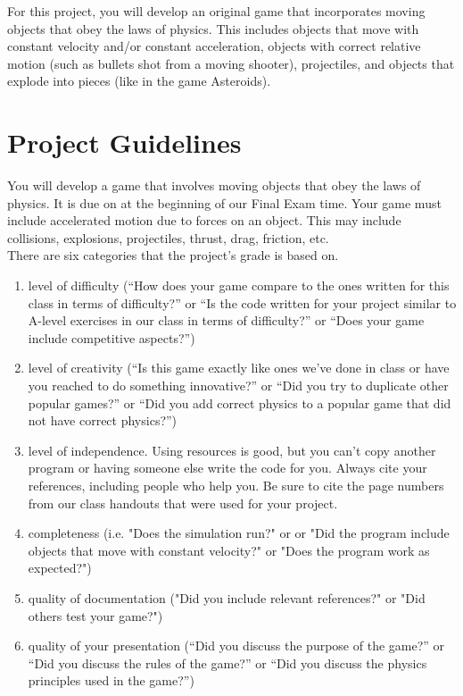 

\longgoal

For this project, you will develop an original game that incorporates moving objects that obey the laws of physics. This includes objects that move with constant velocity and/or constant acceleration, objects with correct relative motion (such as bullets shot from a moving shooter), projectiles, and objects that explode into pieces (like in the game Asteroids).

\section*{Project Guidelines}

You will develop a game that involves moving objects that obey the laws of physics. It is due on at the beginning of our Final Exam time. Your game must include  accelerated motion due to forces on an object. This may include collisions, explosions, projectiles, thrust, drag, friction, etc.\\

\noindent
There are six categories that the project's grade is based on.

\begin{enumerate}
	\item level of difficulty (``How does your game compare to the ones written for this class in terms of difficulty?'' or ``Is the code written for your project similar to A-level exercises in our class in terms of difficulty?'' or ``Does your game include competitive aspects?'')
	\item level of creativity (``Is this game exactly like ones we've done in class or have you reached to do something innovative?'' or ``Did you try to duplicate other popular games?'' or ``Did you add correct physics to a popular game that did not have correct physics?'')
	\item level of independence.  Using resources is good, but you can't copy another program or having someone else write the code for you. Always cite your references, including people who help you. Be sure to cite the page numbers from our class handouts that were used for your project. 
	\item completeness (i.e.  "Does the simulation run?" or  or "Did the program include objects that move with constant velocity?" or "Does the program work as expected?")
	\item quality of documentation ("Did you include relevant references?" or "Did others test your game?")
	\item quality of your presentation (``Did you discuss the purpose of the game?'' or ``Did you discuss the rules of the game?'' or ``Did you discuss the physics principles used in the game?'')
\end{enumerate}

